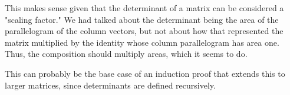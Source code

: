 \documentclass[letterpaper]{article}
\begin{document}
This makes sense given that the determinant of a matrix can be considered a "scaling factor." We had talked about the determinant being the area of the parallelogram of the column vectors, but not about how that represented the matrix multiplied by the identity whose column parallelogram has area one. Thus, the composition should multiply areas, which it seems to do.

This can probably be the base case of an induction proof that extends this to larger matrices, since determinants are defined recursively.
\end{document}
